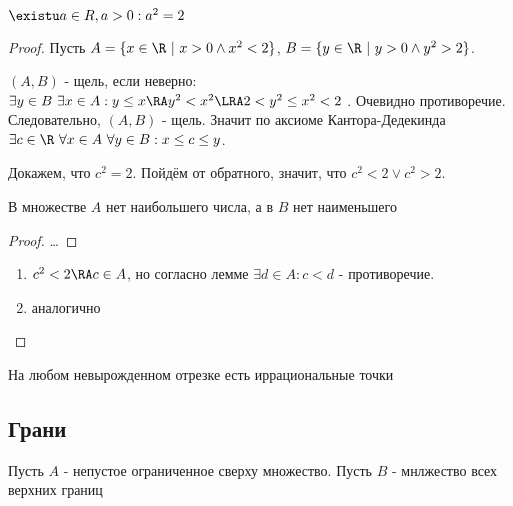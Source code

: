 \documentclass[a4paper, 14pt]{article}
\begin{document}
    \begin{theorem}
        $\existu a \in R, a > 0 : a^2 = 2$
    \end{theorem}
    \begin{proof}
        Пусть $A = \{x \in \R \ \vert \ x > 0 \land x^2 < 2\}$, $B = \{y \in \R \ \vert \ y > 0 \land y^2 > 2\}$.

        $(A, B)$ - щель, если неверно: $\exists y \in B \ \exists x \in A : y \leq x \RA y^2 < x^2 \LRA 2 < y^2 \leq x^2 < 2$ .
        Очевидно противоречие. Следовательно, $(A,B)$ - щель. Значит по аксиоме Кантора-Дедекинда
        $\exists c \in \R \ \forall x \in A \ \forall y \in B: x \leq c \leq y$.

        Докажем, что $c^2 = 2$. Пойдём от обратного, значит, что $c^2 < 2 \lor c^2 > 2$.

        \begin{lemma}
            В множестве $A$ нет наибольшего числа, а в $B$ нет наименьшего
        \end{lemma}
        \begin{proof}
            \dots
        \end{proof}
        \begin{enumerate}
            \item $c^2 < 2 \RA c \in A$, но согласно лемме $\exists d \in A : c < d$ - противоречие.
            \item аналогично
        \end{enumerate}
    \end{proof}

    \begin{theorem}
        На любом невырожденном отрезке есть иррациональные точки
    \end{theorem}


    \subsection{Грани}

    \begin{definition}
        Пусть $A$ - непустое ограниченное сверху множество. Пусть $B$ - мнлжество всех
        верхних границ 
    \end{definition}
\end{document}
